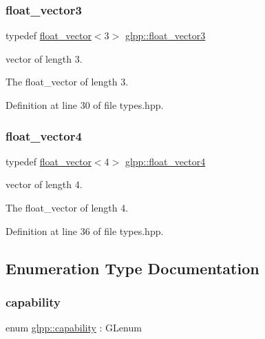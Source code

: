 \subsubsection{\texorpdfstring{float\+\_\+vector3}{float\_vector3}}
{\footnotesize\ttfamily typedef \hyperlink{namespaceglpp_a6c618584338a9ebf15759cea2401f0ae}{float\+\_\+vector}$<$3$>$ \hyperlink{namespaceglpp_a3fa7b207a8b7dba583fb22731a616d73}{glpp\+::float\+\_\+vector3}}



vector of length 3. 

The float\+\_\+vector of length 3. 

Definition at line 30 of file types.\+hpp.

\mbox{\label{namespaceglpp_ab4a3d7b8ed8e2e4810006eef5213a460}} 
\subsubsection{\texorpdfstring{float\+\_\+vector4}{float\_vector4}}
{\footnotesize\ttfamily typedef \hyperlink{namespaceglpp_a6c618584338a9ebf15759cea2401f0ae}{float\+\_\+vector}$<$4$>$ \hyperlink{namespaceglpp_ab4a3d7b8ed8e2e4810006eef5213a460}{glpp\+::float\+\_\+vector4}}



vector of length 4. 

The float\+\_\+vector of length 4. 

Definition at line 36 of file types.\+hpp.



\subsection{Enumeration Type Documentation}
\mbox{\label{namespaceglpp_a1b0f7d2f17d11ae11a12d44571612832}} 
\subsubsection{\texorpdfstring{capability}{capability}}
{\footnotesize\ttfamily enum \hyperlink{namespaceglpp_a1b0f7d2f17d11ae11a12d44571612832}{glpp\+::capability} \+: G\+Lenum\hspace{0.3cm}{\ttfamily [strong]}}



